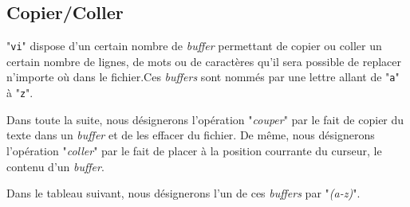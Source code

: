 \subsection{\label{ann-edt-vi-cutpaste}Copier/Coller}

"{\tt vi}" dispose d'un certain nombre de {\sl buffer} permettant
de copier ou coller un certain nombre de lignes, de mots ou de caract{\`e}res
qu'il sera possible de replacer n'importe o{\`u} dans le fichier.Ces
{\sl buffers} sont nomm{\'e}s par une lettre allant de "{\tt a}" {\`a}
"{\tt z}".

Dans toute la suite, nous d{\'e}signerons l'op{\'e}ration "{\sl couper}"
par le fait de copier du texte dans un {\sl buffer} et de les
effacer du fichier. De m{\^e}me, nous d{\'e}signerons l'op{\'e}ration "{\sl coller}"
par le fait de placer {\`a} la position courrante du curseur, le contenu
d'un {\sl buffer}.

Dans le tableau suivant, nous d{\'e}signerons l'un de ces {\sl buffers}
par "{\sl (a-z)}".

